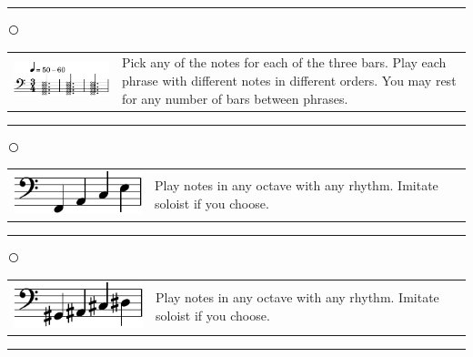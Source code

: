 \documentclass[12pt]{article}
\begin{document}
\vspace{0.3cm}

\hrule

\vspace{0.1cm}

\textcircled{}



\begin{tabular}{l l}
\begin{minipage}{0.5\textwidth}
\includegraphics[scale=1.5]{melodybass.pdf}
\end{minipage}
&
\begin{minipage}{0.4\textwidth}
Pick any of the notes for each of the three bars. Play each phrase with different notes in different orders. You may rest for any number of bars between phrases.
\end{minipage}
\end{tabular}
\vspace{0.3cm}

\hrule

\vspace{0.1cm}

\textcircled{}

\begin{tabular}{l l}
\begin{minipage}{0.5\textwidth}
\includegraphics[scale=1.5]{facebass.pdf}
\end{minipage}
&
\begin{minipage}{0.4\textwidth}
Play notes in any octave with any rhythm. Imitate soloist if you choose. 
\end{minipage}
\end{tabular}

\vspace{0.3cm}

\hrule

\vspace{0.1cm}

\textcircled{}

\begin{tabular}{l l}
\begin{minipage}{0.5\textwidth}
\includegraphics[scale=1.5]{gacdbass.pdf}
\end{minipage}
&
\begin{minipage}{0.4\textwidth}
Play notes in any octave with any rhythm. Imitate soloist if you choose. 
\end{minipage}
\end{tabular}

\vspace{0.3cm}

\hrule
\end{document}
